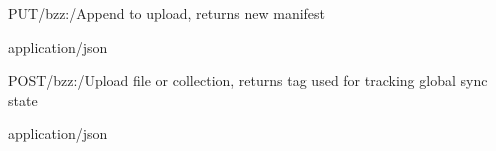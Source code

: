 \begin{apiRoute}{PUT}{/bzz:/}{Append to upload, returns new manifest}
{
}
{ }

\begin{routeParameter} 
\end{routeParameter}
\begin{headerParameter} 
\end{headerParameter}
\begin{routeResponse}{application/json}
\end{routeResponse}
\end{apiRoute}




\begin{apiRoute}{POST}{/bzz:/}{Upload file or collection, returns tag used for tracking global sync state}
{
}
{ }

\begin{routeParameter} 
\end{routeParameter}
\begin{headerParameter} 
\end{headerParameter}
\begin{routeResponse}{application/json}
\end{routeResponse}
\end{apiRoute}


